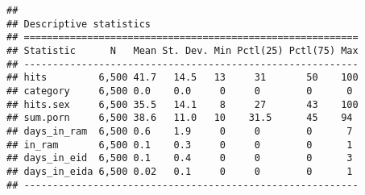 \documentclass[]{article}
\begin{document}
\begin{verbatim}
## 
## Descriptive statistics
## ==========================================================
## Statistic      N   Mean St. Dev. Min Pctl(25) Pctl(75) Max
## ----------------------------------------------------------
## hits         6,500 41.7   14.5   13     31       50    100
## category     6,500 0.0    0.0     0     0        0      0 
## hits.sex     6,500 35.5   14.1    8     27       43    100
## sum.porn     6,500 38.6   11.0   10    31.5      45    94 
## days_in_ram  6,500 0.6    1.9     0     0        0      7 
## in_ram       6,500 0.1    0.3     0     0        0      1 
## days_in_eid  6,500 0.1    0.4     0     0        0      3 
## days_in_eida 6,500 0.02   0.1     0     0        0      1 
## ----------------------------------------------------------
\end{verbatim}
\end{document}
